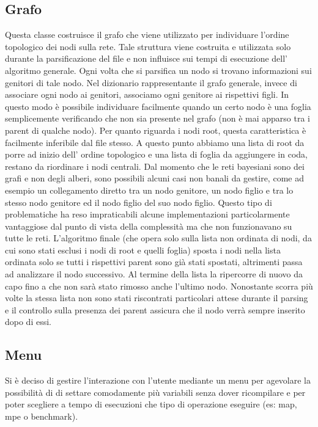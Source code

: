 \subsection{Grafo}
Questa classe costruisce il grafo che viene utilizzato per individuare l’ordine topologico dei nodi sulla rete. Tale struttura viene costruita e utilizzata solo durante la parsificazione del file e non influisce sui tempi di esecuzione dell’ algoritmo generale.
Ogni volta che si parsifica un nodo si trovano informazioni sui genitori di tale nodo. Nel dizionario rappresentante il grafo generale, invece di associare ogni nodo ai genitori, associamo ogni genitore ai rispettivi figli. In questo modo è possibile individuare facilmente quando un certo nodo è una foglia semplicemente verificando che non sia presente nel grafo (non è mai apparso tra i parent di qualche nodo). Per quanto riguarda i nodi root, questa caratteristica è facilmente inferibile dal file stesso. A questo punto abbiamo una lista di root da porre ad inizio dell’ ordine topologico e una lista di foglia da aggiungere in coda, restano da riordinare i nodi centrali. Dal momento che le reti bayesiani sono dei grafi e non degli alberi, sono possibili alcuni casi non banali da gestire, come ad esempio un collegamento diretto tra un nodo genitore, un nodo figlio e tra lo stesso nodo genitore ed il nodo figlio del suo nodo figlio. Questo tipo di problematiche ha reso impraticabili alcune implementazioni particolarmente vantaggiose dal punto di vista della complessità ma che non funzionavano su tutte le reti. L’algoritmo finale (che opera solo sulla lista non ordinata di nodi, da cui sono stati esclusi i nodi di root e quelli foglia) sposta i nodi nella lista ordinata solo se tutti i rispettivi parent sono già stati spostati, altrimenti passa ad analizzare il nodo successivo. Al termine della lista la ripercorre di nuovo da capo fino a che non sarà stato rimosso anche l’ultimo nodo. Nonostante scorra più volte la stessa lista non sono stati riscontrati particolari attese durante il parsing e il controllo sulla presenza dei parent assicura che il nodo verrà sempre inserito dopo di essi.

\subsection{Menu}
Si è deciso di gestire l’interazione con l’utente mediante un menu per agevolare la possibilità di di settare comodamente più variabili senza dover ricompilare e per poter scegliere a tempo di esecuzioni che tipo di operazione eseguire (es: map, mpe o benchmark).


